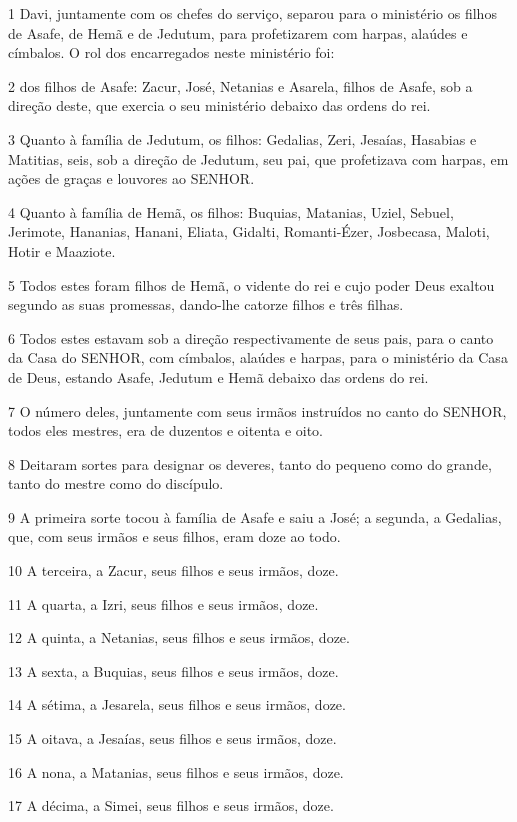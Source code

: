 \par 1 Davi, juntamente com os chefes do serviço, separou para o ministério os filhos de Asafe, de Hemã e de Jedutum, para profetizarem com harpas, alaúdes e címbalos. O rol dos encarregados neste ministério foi:
\par 2 dos filhos de Asafe: Zacur, José, Netanias e Asarela, filhos de Asafe, sob a direção deste, que exercia o seu ministério debaixo das ordens do rei.
\par 3 Quanto à família de Jedutum, os filhos: Gedalias, Zeri, Jesaías, Hasabias e Matitias, seis, sob a direção de Jedutum, seu pai, que profetizava com harpas, em ações de graças e louvores ao SENHOR.
\par 4 Quanto à família de Hemã, os filhos: Buquias, Matanias, Uziel, Sebuel, Jerimote, Hananias, Hanani, Eliata, Gidalti, Romanti-Ézer, Josbecasa, Maloti, Hotir e Maaziote.
\par 5 Todos estes foram filhos de Hemã, o vidente do rei e cujo poder Deus exaltou segundo as suas promessas, dando-lhe catorze filhos e três filhas.
\par 6 Todos estes estavam sob a direção respectivamente de seus pais, para o canto da Casa do SENHOR, com címbalos, alaúdes e harpas, para o ministério da Casa de Deus, estando Asafe, Jedutum e Hemã debaixo das ordens do rei.
\par 7 O número deles, juntamente com seus irmãos instruídos no canto do SENHOR, todos eles mestres, era de duzentos e oitenta e oito.
\par 8 Deitaram sortes para designar os deveres, tanto do pequeno como do grande, tanto do mestre como do discípulo.
\par 9 A primeira sorte tocou à família de Asafe e saiu a José; a segunda, a Gedalias, que, com seus irmãos e seus filhos, eram doze ao todo.
\par 10 A terceira, a Zacur, seus filhos e seus irmãos, doze.
\par 11 A quarta, a Izri, seus filhos e seus irmãos, doze.
\par 12 A quinta, a Netanias, seus filhos e seus irmãos, doze.
\par 13 A sexta, a Buquias, seus filhos e seus irmãos, doze.
\par 14 A sétima, a Jesarela, seus filhos e seus irmãos, doze.
\par 15 A oitava, a Jesaías, seus filhos e seus irmãos, doze.
\par 16 A nona, a Matanias, seus filhos e seus irmãos, doze.
\par 17 A décima, a Simei, seus filhos e seus irmãos, doze.
